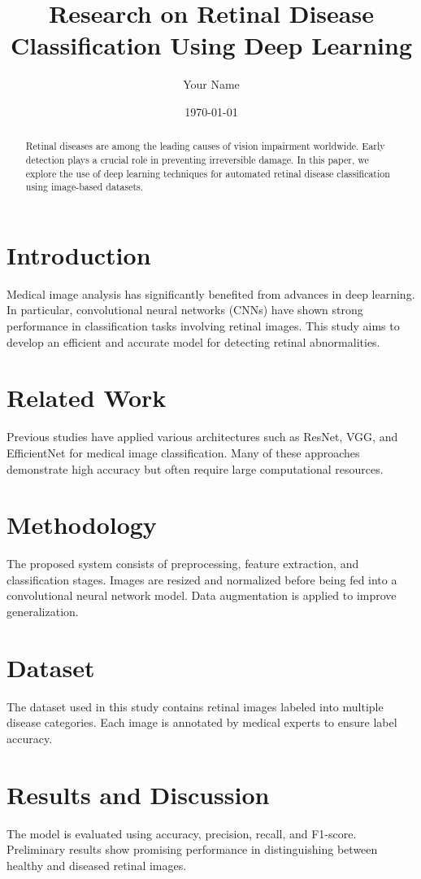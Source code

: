 \documentclass[11pt]{article}
\title{Research on Retinal Disease Classification Using Deep Learning}
\author{Your Name}
\date{\today}
\begin{document}
\maketitle

\begin{abstract}
Retinal diseases are among the leading causes of vision impairment worldwide. Early detection plays a crucial role in preventing irreversible damage. In this paper, we explore the use of deep learning techniques for automated retinal disease classification using image-based datasets.
\end{abstract}

\section{Introduction}
Medical image analysis has significantly benefited from advances in deep learning. In particular, convolutional neural networks (CNNs) have shown strong performance in classification tasks involving retinal images. This study aims to develop an efficient and accurate model for detecting retinal abnormalities.

\section{Related Work}
Previous studies have applied various architectures such as ResNet, VGG, and EfficientNet for medical image classification. Many of these approaches demonstrate high accuracy but often require large computational resources.

\section{Methodology}
The proposed system consists of preprocessing, feature extraction, and classification stages. Images are resized and normalized before being fed into a convolutional neural network model. Data augmentation is applied to improve generalization.

\section{Dataset}
The dataset used in this study contains retinal images labeled into multiple disease categories. Each image is annotated by medical experts to ensure label accuracy.

\section{Results and Discussion}
The model is evaluated using accuracy, precision, recall, and F1-score. Preliminary results show promising performance in distinguishing between healthy and diseased retinal images.
\end{document}
